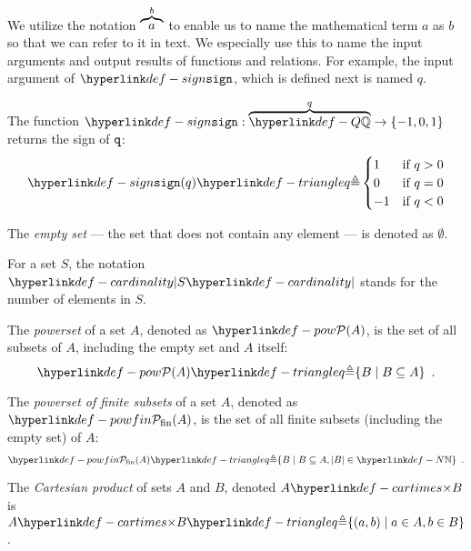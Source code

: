 We utilize the notation $\overbrace{a}^{b}$ to enable us to name the mathematical term $a$ as $b$ so that
we can refer to it in text. We especially use this to name the input arguments and
output results of functions and relations. For example, the input argument of $\sign$,
which is defined next is named $q$.

\hypertarget{def-sign}{}
\begin{definition}
  The function $\sign : \overname{\Q}{q} \rightarrow \{-1,0,1\}$ returns the sign of $\texttt{q}$:
\[
\sign(q) \triangleq \begin{cases}
  1 & \text{if }q > 0\\
  0 & \text{if }q = 0\\
  -1 & \text{if }q < 0
\end{cases}
\]
\end{definition}

\begin{definition}
  The \emph{empty set} --- the set that does not contain any element --- is denoted as $\emptyset$.
\end{definition}

\hypertarget{def-cardinality}{}
\begin{definition}
  For a set $S$, the notation $\cardinality{S}$ stands for the number of elements in $S$.
\end{definition}

\hypertarget{def-pow}{}
\begin{definition}[Powerset]
  The \emph{powerset} of a set $A$, denoted as $\pow{A}$, is the set of all subsets of $A$, including the empty set and $A$ itself:
  \[
     \pow{A} \triangleq \{ B \;|\; B \subseteq A\} \enspace.
  \]
\end{definition}

\hypertarget{def-powfin}{}
\begin{definition}
  The \emph{powerset of finite subsets} of a set $A$, denoted as $\powfin{A}$, is the set of all finite subsets (including the empty set) of $A$:
  \[
     \powfin{A} \triangleq \{ B \;|\; B \subseteq A, |B| \in \N\} \enspace.
  \]
\end{definition}

\hypertarget{def-cartimes}{}
\begin{definition}
    The \emph{Cartesian product} of sets $A$ and $B$, denoted $A \cartimes B$
    is $A \cartimes B \triangleq \{(a,b) \;|\; a \in A, b \in B\}$.
\end{definition}

